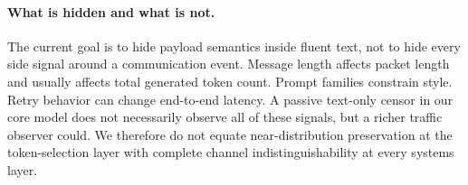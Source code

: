 \paragraph{What is hidden and what is not.} The current goal is to hide payload semantics inside fluent text, not to hide every side signal around a communication event. Message length affects packet length and usually affects total generated token count. Prompt families constrain style. Retry behavior can change end-to-end latency. A passive text-only censor in our core model does not necessarily observe all of these signals, but a richer traffic observer could. We therefore do not equate near-distribution preservation at the token-selection layer with complete channel indistinguishability at every systems layer.
